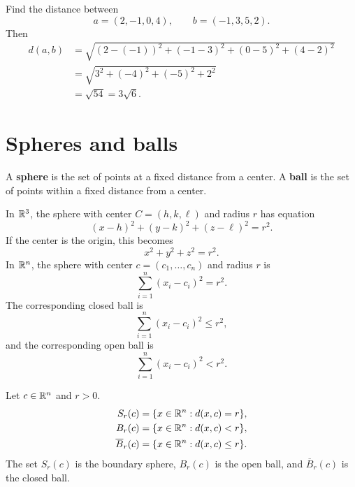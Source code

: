 \begin{examplebox}[title={Worked example: distance in $\R^4$}]
Find the distance between
\[
  a=(2,-1,0,4),\qquad b=(-1,3,5,2).
\]
Then
\[
\begin{aligned}
d(a,b)
&=\sqrt{(2-(-1))^2+(-1-3)^2+(0-5)^2+(4-2)^2}\\
&=\sqrt{3^2+(-4)^2+(-5)^2+2^2}\\
&=\sqrt{54}=3\sqrt 6.
\end{aligned}
\]
\end{examplebox}

\section{Spheres and balls}

A \textbf{sphere} is the set of points at a fixed distance from a center. A \textbf{ball} is the set of points within a fixed distance from a center.

In $\mathbb{R}^3$, the sphere with center $C=(h,k,\ell)$ and radius $r$ has equation
\[
  (x-h)^2+(y-k)^2+(z-\ell)^2=r^2.
\]
If the center is the origin, this becomes
\[
  x^2+y^2+z^2=r^2.
\]
In $\mathbb{R}^n$, the sphere with center $c=(c_1,\ldots,c_n)$ and radius $r$ is
\[
  \sum_{i=1}^n(x_i-c_i)^2=r^2.
\]
The corresponding closed ball is
\[
  \sum_{i=1}^n(x_i-c_i)^2\le r^2,
\]
and the corresponding open ball is
\[
  \sum_{i=1}^n(x_i-c_i)^2<r^2.
\]

\begin{definitionbox}[title={Sphere and ball}]
Let $c\in\mathbb{R}^n$ and $r>0$.
\[
\begin{aligned}
S_r(c)&=\{x\in\mathbb{R}^n:d(x,c)=r\},\\
B_r(c)&=\{x\in\mathbb{R}^n:d(x,c)<r\},\\
\overline B_r(c)&=\{x\in\mathbb{R}^n:d(x,c)\le r\}.
\end{aligned}
\]
The set $S_r(c)$ is the boundary sphere, $B_r(c)$ is the open ball, and $\overline B_r(c)$ is the closed ball.
\end{definitionbox}

